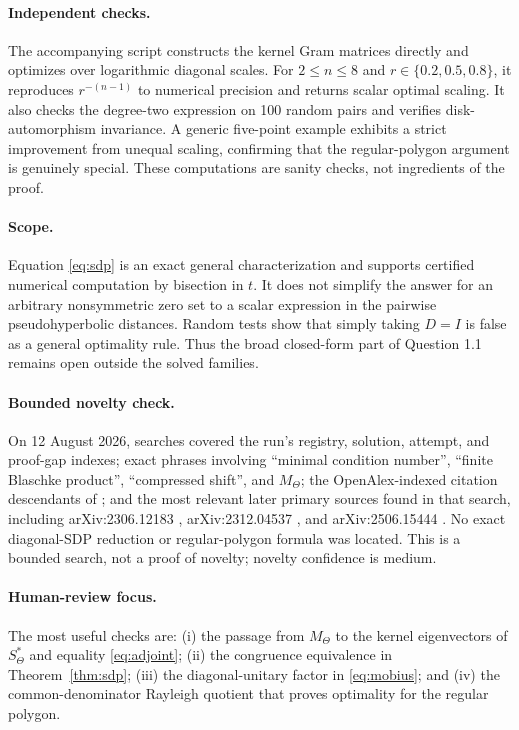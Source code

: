 \documentclass[11pt]{article}
\begin{document}
\paragraph{Independent checks.}
The accompanying script constructs the kernel Gram matrices directly and
optimizes over logarithmic diagonal scales.  For $2\leq n\leq8$ and
$r\in\{0.2,0.5,0.8\}$, it reproduces $r^{-(n-1)}$ to numerical precision and
returns scalar optimal scaling.  It also checks the degree-two expression on
100 random pairs and verifies disk-automorphism invariance.  A generic
five-point example exhibits a strict improvement from unequal scaling,
confirming that the regular-polygon argument is genuinely special.  These
computations are sanity checks, not ingredients of the proof.

\paragraph{Scope.}
Equation \eqref{eq:sdp} is an exact general characterization and supports
certified numerical computation by bisection in $t$.  It does not simplify the
answer for an arbitrary nonsymmetric zero set to a scalar expression in the
pairwise pseudohyperbolic distances.  Random tests show that simply taking
$D=I$ is false as a general optimality rule.  Thus the broad closed-form part
of Question 1.1 remains open outside the solved families.

\paragraph{Bounded novelty check.}
On 12 August 2026, searches covered the run's registry, solution, attempt, and
proof-gap indexes; exact phrases involving ``minimal condition number'',
``finite Blaschke product'', ``compressed shift'', and $M_\Theta$; the
OpenAlex-indexed citation descendants of \cite{BGGRSW}; and the most relevant
later primary sources found in that search, including arXiv:2306.12183
\cite{OV}, arXiv:2312.04537 \cite{BCGGV}, and arXiv:2506.15444 \cite{Renard}.
No exact diagonal-SDP reduction or regular-polygon formula was located.  This
is a bounded search, not a proof of novelty; novelty confidence is medium.

\paragraph{Human-review focus.}
The most useful checks are: (i) the passage from $M_\Theta$ to the kernel
eigenvectors of $S_\Theta^*$ and equality \eqref{eq:adjoint}; (ii) the
congruence equivalence in Theorem~\ref{thm:sdp}; (iii) the diagonal-unitary
factor in \eqref{eq:mobius}; and (iv) the common-denominator Rayleigh quotient
that proves optimality for the regular polygon.
\end{document}
